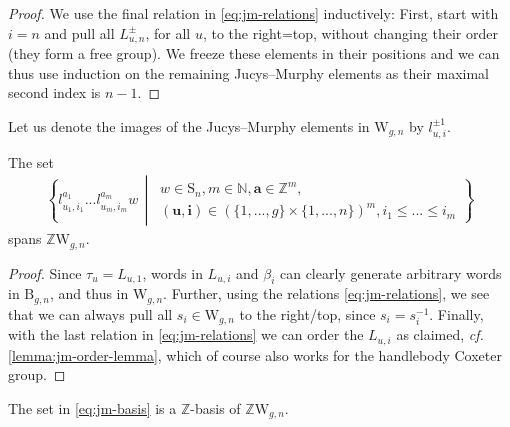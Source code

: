 \documentclass[a4paper,11pt]{amsart}
\newcommand{\cf}{\textsl{cf.}}
\renewcommand{\dots}{\text{...}}
\newcommand{\setstuff}[1]{\mathrm{#1}}
\newcommand{\Z}{\mathbb{Z}}
\newcommand{\N}{\mathbb{N}}
\newcommand{\bsym}[1]{\boldsymbol{#1}}
\newcommand{\jm}{L}
\newcommand{\jmc}{l}
\numberwithin{equation}{section}
\let\fullref\autoref
\begin{document}
\begin{proof}
We use the final relation in \eqref{eq:jm-relations}
inductively: First, start with $i=n$ and pull 
all $\jm_{u,n}^{\pm}$, for all $u$, to the right=top, 
without changing their order (they form a free group).
We freeze these elements in their positions and
we can thus use induction 
on the remaining Jucys--Murphy elements 
as their maximal second index is $n-1$.
\end{proof}

Let us denote the images of the Jucys--Murphy elements
in $\setstuff{W}_{g,n}$ by $\jmc_{u,i}^{\pm 1}$.

\begin{lemma}\label{lemma:jm-elements-span}
The set
\begin{gather}\label{eq:jm-basis}
\left\{ 
\jmc_{u_{1},i_{1}}^{a_{1}}\dots 
\jmc_{u_{m},i_{m}}^{a_{m}}w 
\,\middle\vert\,
\begin{gathered}
w\in\setstuff{S}_{n},
m\in\N,
\bsym{a}\in\Z^{m},
\\
(\bsym{u},\bsym{i})\in(\{1,\dots,g\}\times\{1,\dots,n\})^{m},
i_{1}\leq\dots\leq i_{m}
\end{gathered}
\right\}
\end{gather}
spans $\Z\setstuff{W}_{g,n}$.
\end{lemma}

\begin{proof}
Since $\tau_{u}=\jm_{u,1}$, words in 
$\jm_{u,i}$ and $\beta_{i}$ can clearly 
generate arbitrary words in $\setstuff{B}_{g,n}$, and thus in 
$\setstuff{W}_{g,n}$.
Further, using the relations \eqref{eq:jm-relations}, 
we see that we can always pull all
$s_{i}\in\setstuff{W}_{g,n}$ to the right/top, since 
$s_{i}=s_{i}^{-1}$. Finally, with the last 
relation in \eqref{eq:jm-relations} we can order the $\jm_{u,i}$ 
as claimed, {\cf} \fullref{lemma:jm-order-lemma}, which of course 
also works for the handlebody Coxeter group.
\end{proof}

\begin{proposition}\label{proposition:jm-elements-basis}
The set in \eqref{eq:jm-basis}
is a $\Z$-basis of $\Z\setstuff{W}_{g,n}$.
\end{proposition}
\end{document}
